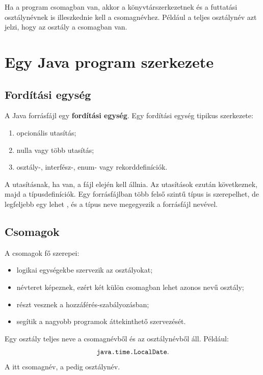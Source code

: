 Ha a program csomagban van, akkor a könyvtárszerkezetnek és a futtatási osztálynévnek is illeszkednie kell a csomagnévhez. Például a  teljes osztálynév azt jelzi, hogy az osztály a  csomagban van.

\section{Egy Java program szerkezete}

\subsection{Fordítási egység}

A Java forrásfájl egy \textbf{fordítási egység}. Egy fordítási egység tipikus szerkezete:

\begin{enumerate}
  \item opcionális  utasítás;
  \item nulla vagy több  utasítás;
  \item osztály-, interfész-, enum- vagy rekorddefiníciók.
\end{enumerate}

A  utasításnak, ha van, a fájl elején kell állnia. Az  utasítások ezután következnek, majd a típusdefiníciók. Egy forrásfájlban több felső szintű típus is szerepelhet, de legfeljebb egy lehet , és a  típus neve megegyezik a forrásfájl nevével.

\subsection{Csomagok}

A csomagok fő szerepei:

\begin{itemize}
  \item logikai egységekbe szervezik az osztályokat;
  \item névteret képeznek, ezért két külön csomagban lehet azonos nevű osztály;
  \item részt vesznek a hozzáférés-szabályozásban;
  \item segítik a nagyobb programok áttekinthető szervezését.
\end{itemize}

Egy osztály teljes neve a csomagnévből és az osztálynévből áll. Például:
\[
  \texttt{java.time.LocalDate}.
\]
A  itt csomagnév, a  pedig osztálynév.

